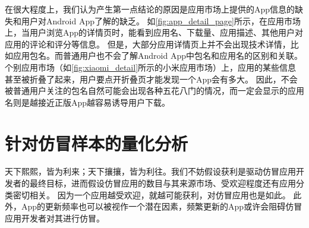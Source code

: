 在很大程度上，我们认为产生第一点结论的原因是应用市场上提供的App信息的缺失和用户对Android App了解的缺乏。
如\autoref{fig:app_detail_page}所示，在应用市场上，当用户浏览App的详情页时，能看到应用名、下载量、应用描述、其他用户对应用的评论和评分等信息。
但是，大部分应用详情页上并不会出现技术详情，比如应用包名。而普通用户也不会了解Android App中包名和应用名的区别和关联。
个别应用市场（如\autoref{fig:xiaomi_detail}所示的小米应用市场）上，应用的某些信息甚至被折叠了起来，用户要点开折叠页才能发现一个App会有多大。
因此，不会被普通用户关注的包名自然可能会出现各种五花八门的情况，而一定会显示的应用名则是越接近正版App越容易诱导用户下载。

\vspace{5mm}
\noindent{}

\section{针对仿冒样本的量化分析}
\label{sec:quantitativeStudy}
天下熙熙，皆为利来；天下攘攘，皆为利往。我们不妨假设获利是驱动仿冒应用开发者的最终目标，进而假设仿冒应用的数目与其来源市场、受欢迎程度还有应用分类密切相关。
因为一个应用越受欢迎，就越可能获利，对仿冒应用也是如此。
此外，App的更新频率也可以被视作一个潜在因素，频繁更新的App或许会阻碍仿冒应用开发者对其进行仿冒。


